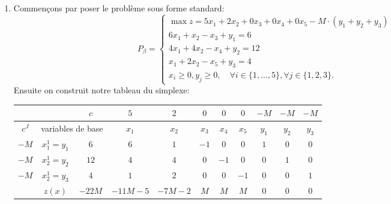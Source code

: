 \begin{td-sol}[]\ %
    \begin{enumerate}
        \item Commençons par poser le problème sous forme standard:
        \begin{equation*}
            P_\beta =
            \begin{cases}
                \max z = 5x_1 + 2x_2 + 0x_3 + 0x_4 + 0x_5 - M\cdot(y_1 + y_2 + y_3)\\
                6x_1 + x_2 - x_3 + y_1 = 6\\
                4x_1 + 4x_2 - x_4 + y_2 = 12\\
                x_1 + 2x_2 - x_5 + y_3 = 4\\
                x_i\geq 0, y_j \geq 0,\quad \forall i \in \{1,\ldots,5\}, \forall j \in \{1,2,3\}.
            \end{cases}
        \end{equation*}
        Ensuite on construit notre tableau du simplexe:
        \begin{center}
            \begin{tabular}{|ccc|cccccccc|} %
                \hline  %
                & \ &\(c\)&\(5\)&\(2\)&\(0\)&\(0\)&\(0\)&\(-M\)&\(-M\)&\(-M\)\\
                \hline %
                \multicolumn{1}{|c|}{\(c^J\)}& \multicolumn{2}{c|}{variables de base}&\(x_1\)&\(x_2\)&\(x_3\)&\(x_4\)&\(x_5\)&\(y_1\)&\(y_2\)&\(y_3\)\\
                \hline %
                \multicolumn{1}{|c|}{\(-M\)}& \multicolumn{1}{c|}{\(x_1^{1}=y_1\)} &\(6\)&\(6\)&\(1\)&\(-1\)&\(0\)&\(0\)&\(1\)&\(0\)&\(0\)\\
                \hline %
                \multicolumn{1}{|c|}{\(-M\)}& \multicolumn{1}{c|}{\(x_2^{1}=y_2\)} &\(12\)&\(4\)&\(4\)&\(0\)&\(-1\)&\(0\)&\(0\)&\(1\)&\(0\)\\
                \hline %
                \multicolumn{1}{|c|}{\(-M\)}& \multicolumn{1}{c|}{\(x_2^{1}=y_3\)} &\(4\)&\(1\)&\(2\)&\(0\)&\(0\)&\(-1\)&\(0\)&\(0\)&\(1\)\\
                \hline %
                \multicolumn{1}{|c|}{} &\(z(x)\)& \multicolumn{1}{|c|}{\(-22M\)} &\(-11M-5\)&\(-7M-2\)&\(M\)&\(M\)&\(M\)&\(0\)&\(0\)&\(0\)\\
                \hline %
            \end{tabular}
        \end{center}
    \end{enumerate}
\end{td-sol}

